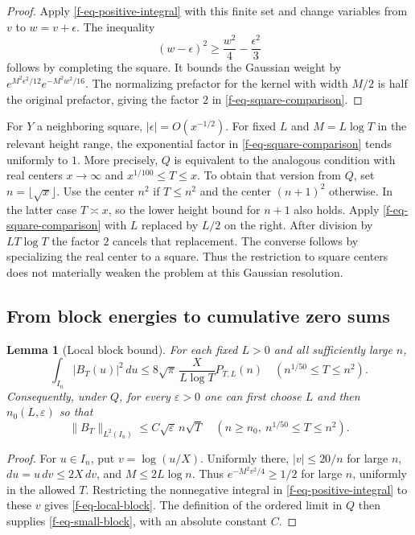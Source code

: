 \documentclass[11pt,a4paper]{article}
\newtheorem{lemma}[theorem]{Lemma}
\theoremstyle{definition}
\theoremstyle{remark}
\begin{document}
\begin{proof}
Apply \eqref{f-eq-positive-integral} with this finite set and change
variables from $v$ to $w=v+\epsilon$.  The inequality
\[
 (w-\epsilon)^2\ge\frac{w^2}{4}-\frac{\epsilon^2}{3}
\]
follows by completing the square.  It bounds the Gaussian weight by
$e^{M^2\epsilon^2/12}e^{-M^2w^2/16}$.  The normalizing prefactor for the
kernel with width $M/2$ is half the original prefactor, giving the factor
$2$ in \eqref{f-eq-square-comparison}.
\end{proof}

For $Y$ a neighboring square, $|\epsilon|=O(x^{-1/2})$.  For fixed $L$ and
$M=L\log T$ in the relevant height range, the exponential factor in
\eqref{f-eq-square-comparison} tends uniformly to $1$.  More precisely,
$Q$ is equivalent to the analogous condition with real centers $x\to\infty$
and $x^{1/100}\le T\le x$.  To obtain that version from $Q$, set
$n=\lfloor\sqrt{x}\rfloor$.  Use the center $n^2$ if $T\le n^2$ and the
center $(n+1)^2$ otherwise.  In the latter case $T\asymp x$, so the lower
height bound for $n+1$ also holds.  Apply
\eqref{f-eq-square-comparison} with $L$ replaced by $L/2$ on the right.
After division by $LT\log T$ the factor $2$ cancels that replacement.
The converse follows by specializing the real center to a square.  Thus the
restriction to square centers does not materially weaken the problem at
this Gaussian resolution.

\subsection{From block energies to cumulative zero sums}
\label{f-sub-block-sums}

\begin{lemma}[Local block bound]
\label{f-lem-local-block}
For each fixed $L>0$ and all sufficiently large $n$,
\begin{equation}
 \int_{I_n}|B_T(u)|^2\,du
 \le 8\sqrt\pi\,\frac{X}{L\log T}P_{T,L}(n)
 \quad(n^{1/50}\le T\le n^2).
 \label{f-eq-local-block}
\end{equation}
Consequently, under $Q$, for every $\varepsilon>0$ one can first choose
$L$ and then $n_0(L,\varepsilon)$ so that
\begin{equation}
 \|B_T\|_{L^2(I_n)}\le C\sqrt\varepsilon\,n\sqrt T
 \quad(n\ge n_0,\ n^{1/50}\le T\le n^2).
 \label{f-eq-small-block}
\end{equation}
\end{lemma}

\begin{proof}
For $u\in I_n$, put $v=\log(u/X)$.  Uniformly there,
$|v|\le20/n$ for large $n$, $du=u\,dv\le2X\,dv$, and
$M\le2L\log n$.  Thus $e^{-M^2v^2/4}\ge1/2$ for large $n$, uniformly in
the allowed $T$.  Restricting the nonnegative integral in
\eqref{f-eq-positive-integral} to these $v$ gives
\eqref{f-eq-local-block}.  The definition of the ordered limit in $Q$
then supplies \eqref{f-eq-small-block}, with an absolute constant $C$.
\end{proof}
\end{document}
